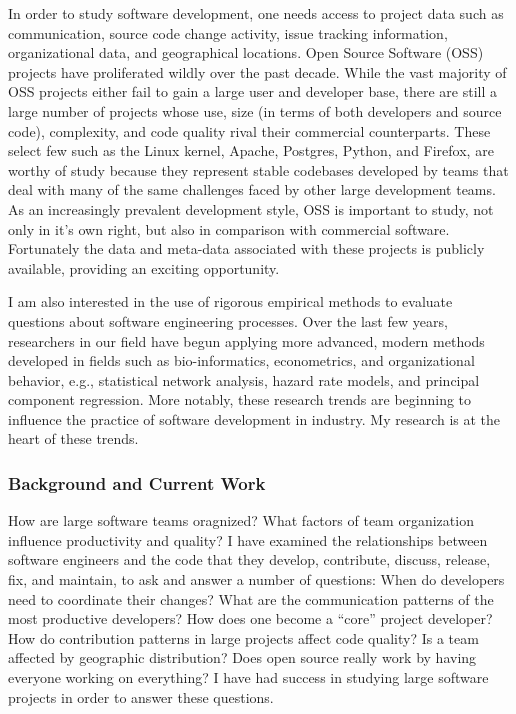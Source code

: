 \documentclass[10pt]{article}
\newcommand\Section[1]{\subsubsection*{\large #1}}
\begin{document}
\begin{small}
In order to study software development, one needs access to project data such
as communication, source code change activity, issue tracking information,
organizational data, and geographical locations.  Open Source Software (OSS)
projects have proliferated wildly over the past decade.  While the vast
majority of OSS projects either fail to gain a large user and developer base,
there are still a large number of projects whose use, size (in terms of both
developers and source code), complexity, and code quality rival their
commercial counterparts.  These select few such as the Linux kernel, Apache,
Postgres, Python, and Firefox, are worthy of study because they represent
stable codebases developed by teams that deal with many of the same challenges
faced by other large development teams.  As an increasingly prevalent
development style, OSS is important to study, not only in it's own right, but also
in comparison with commercial software.
Fortunately the data and meta-data associated with these projects is publicly
available, providing an exciting opportunity.

I am also interested in the use of rigorous empirical methods to evaluate
questions about software engineering processes.  Over the last few years,
researchers in our field have begun applying more advanced, modern methods
developed in fields such as bio-informatics, econometrics, and organizational
behavior, e.g., statistical network analysis, hazard rate models, and principal
component regression.  More notably, these research trends are beginning to
influence the practice of software development in industry.  My research is at
the heart of these trends.

\Section{Background and Current Work}

How are large software teams oragnized? What factors of team organization
influence productivity and quality?  I have examined the relationships between
software engineers and the code that they develop, contribute, discuss,
release, fix, and maintain, to ask and answer a number of questions: When do
developers need to coordinate their changes?  What are the communication
patterns of the most productive developers?  How does one become a ``core''
project developer?  How do contribution patterns in large projects affect code
quality? Is a team affected by geographic distribution? Does open source really
work by having everyone working on everything?  I have had success in studying
large software projects in order to answer these questions.


\end{small}
\end{document}
